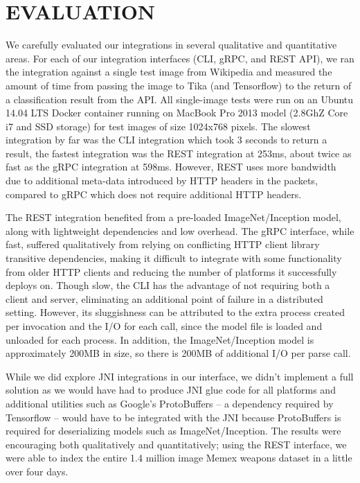 \section {EVALUATION} \label{sec:evaluation}

We carefully evaluated our integrations in several qualitative and quantitative areas. For each of our integration interfaces (CLI, gRPC, and REST API), we ran the integration against a single test image from Wikipedia and measured the amount of time from passing the image to Tika (and Tensorflow) to the return of a classification result from the API. All single-image tests were run on an Ubuntu 14.04 LTS Docker container running on MacBook Pro 2013 model (2.8GhZ Core i7 and SSD storage) for test images of size 1024x768 pixels. The slowest integration by far was the CLI integration which took 3 seconds to return a result, the fastest integration was the REST integration at 253ms, about twice as fast as the gRPC integration at 598ms. However, REST uses more bandwidth due to additional meta-data introduced by HTTP headers in the packets, compared to gRPC which does not require additional HTTP headers.

The REST integration benefited from a pre-loaded ImageNet/Inception model, along with lightweight dependencies and low overhead. The gRPC interface, while fast, suffered qualitatively from relying on conflicting HTTP client library transitive dependencies, making it difficult to integrate with some functionality from older HTTP clients and reducing the number of platforms it successfully deploys on. Though slow, the CLI has the advantage of not requiring both a client and server, eliminating an additional point of failure in a distributed setting. However, its sluggishness can be attributed to the extra process created per invocation and the I/O for each call, since the model file is loaded and unloaded for each process. In addition, the ImageNet/Inception model is approximately 200MB in size, so there is 200MB of additional I/O per parse call.

While we did explore JNI integrations in our interface, we didn't implement a full solution as we would have had to produce JNI glue code for all platforms and additional utilities such as Google's ProtoBuffers -- a dependency required by Tensorflow -- would have to be integrated with the JNI because ProtoBuffers is required for deserializing models such as ImageNet/Inception\cite{javacpp-240}. The results  were encouraging both qualitatively and quantitatively; using the REST interface, we were able to index the entire 1.4 million image Memex weapons dataset in a little over four days.

